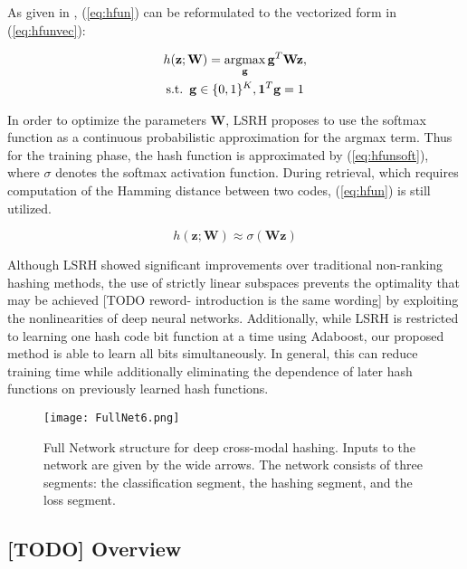 \documentclass[letterpaper]{article}
\newcommand{\argmax}{\operatornamewithlimits{argmax}}
\begin{document}
As given in \cite{kai}, (\ref{eq:hfun}) can be reformulated to the vectorized form in (\ref{eq:hfunvec}):

\begin{equation}
\label{eq:hfunvec}
\begin{gathered}
h(\mathbf{z}; \mathbf{W}) = \argmax\limits_{\mathbf{g}} \mathbf{g}^T \mathbf{Wz}, \\
\text{s.t.} \enspace \mathbf{g} \in \{0,1\}^K, \mathbf{1}^T\mathbf{g} = 1
\end{gathered}
\end{equation}

In order to optimize the parameters $ \mathbf{W} $, LSRH proposes to use the softmax function as a continuous probabilistic approximation for the argmax term. Thus for the training phase, the hash function is approximated by (\ref{eq:hfunsoft}), where $ \sigma $ denotes the softmax activation function. During retrieval, which requires computation of the Hamming distance between two codes, (\ref{eq:hfun}) is still utilized.

\begin{equation}
\label{eq:hfunsoft}
h(\mathbf{z}; \mathbf{W}) \approx \sigma(\mathbf{Wz})
\end{equation}

Although LSRH showed significant improvements over traditional non-ranking hashing methods, the use of strictly linear subspaces prevents the optimality that may be achieved [TODO reword- introduction is the same wording] by exploiting the nonlinearities of deep neural networks. Additionally, while LSRH is restricted to learning one hash code bit function at a time using Adaboost, our proposed method is able to learn all bits simultaneously. In general, this can reduce training time while additionally eliminating the dependence of later hash functions on previously learned hash functions.

\begin{figure*}
	\centering
	\texttt{[image: FullNet6.png]}
	\caption{\label{fig:fullnet}Full Network structure for deep cross-modal hashing. Inputs to the network are given by the wide arrows. The network consists of three segments: the classification segment, the hashing segment, and the loss segment.}
\end{figure*}

\subsection{[TODO] Overview}
\end{document}
